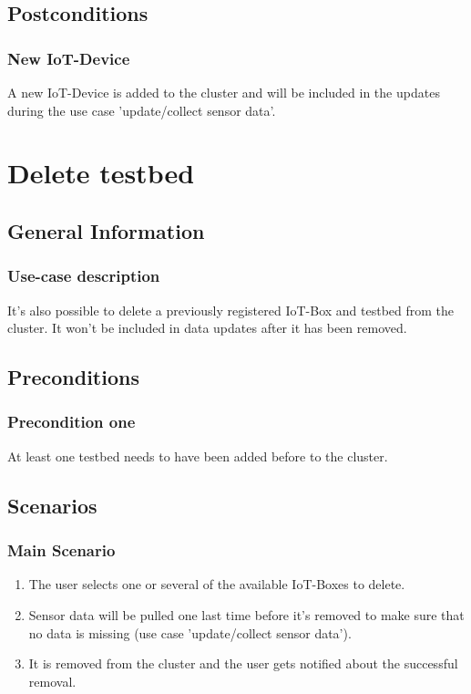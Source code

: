 \documentclass[notitlepage]{article}
\begin{document}
\subsection{Postconditions}

\subsubsection{New IoT-Device}

A new IoT-Device is added to the cluster and will be included in the updates during the use case 'update/collect sensor data'.

\section{Delete testbed}

\subsection{General Information}
\subsubsection{Use-case description}

It's also possible to delete a previously registered IoT-Box and testbed from the cluster. It won't be included in data updates after it has been removed.

\subsection{Preconditions}

\subsubsection{Precondition one}
At least one testbed needs to have been added before to the cluster.

\subsection{Scenarios}

\subsubsection{Main Scenario}

\begin{enumerate}
	
	\item The user selects one or several of the available IoT-Boxes to delete.
	      
	\item Sensor data will be pulled one last time before it's removed to make sure that no data is missing (use case 'update/collect sensor data').
	      
	\item It is removed from the cluster and the user gets notified about the successful removal.
	      
\end{enumerate}
\end{document}
